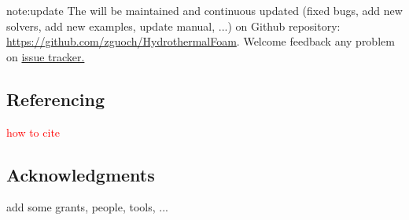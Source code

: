 \begin{theo}{note:update}
	The \foam will be maintained and  continuous updated (fixed bugs, add new solvers, add new examples, update manual, ...) on Github repository: \href{https://github.com/zguoch/HydrothermalFoam}{https://github.com/zguoch/HydrothermalFoam}. Welcome feedback any problem on \href{https://github.com/zguoch/HydrothermalFoam/issues}{issue tracker.}
\end{theo}

\subsection{Referencing \foam}
\textcolor{red}{how to cite \foam}

\subsection{Acknowledgments}
add some grants, people, tools, ...




